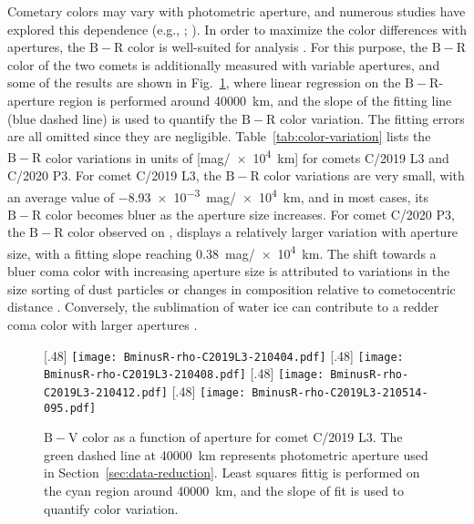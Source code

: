 Cometary colors may vary with photometric aperture, and numerous studies have explored this dependence (e.g., \citealt{betzler_analysis_2017}; \citealt{kolokolova_color_2003}). In order to maximize the color differences with apertures, the $\mathrm{B-R}$ color is well-suited for analysis \citep{jewittCOLORSYSTEMATICSCOMETS2015}. For this purpose, the $\mathrm{B-R}$ color of the two comets is additionally measured with variable apertures, and some of the results are shown in Fig.~\ref{fig:color-aper}, where linear regression on the $\mathrm{B-R}$-aperture region is performed around \qty{40000}{\km}, and the slope of the fitting line (blue dashed line) is used to quantify the $\mathrm{B-R}$ color variation. The fitting errors are all omitted since they are negligible. Table~\ref{tab:color-variation} lists the $\mathrm{B-R}$ color variations in units of [\unit{mag/\qty{e4}{\km}}] for comets C/2019 L3 and C/2020 P3. For comet C/2019 L3, the $\mathrm{B-R}$ color variations are very small, with an average value of \qty{-8.93e-3}{mag/\qty{e4}{\km}}, and in most cases, its $\mathrm{B-R}$ color becomes bluer as the aperture size increases. For comet C/2020 P3, the $\mathrm{B-R}$ color observed on , displays a relatively larger variation with aperture size, with a fitting slope reaching \qty{0.38}{mag/\qty{e4}{\km}}. The shift towards a bluer coma color with increasing aperture size is attributed to variations in the size sorting of dust particles or changes in composition relative to cometocentric distance \citep{kolokolova_physical_2004}. Conversely, the sublimation of water ice can contribute to a redder coma color with larger apertures \citep{kolokolova_color_2003}. 


\begin{figure}
    \centering
    [.48\linewidth]{
        \texttt{[image: BminusR-rho-C2019L3-210404.pdf]}
    }
    [.48\linewidth]{
        \texttt{[image: BminusR-rho-C2019L3-210408.pdf]}
    }
    [.48\linewidth]{
        \texttt{[image: BminusR-rho-C2019L3-210412.pdf]}
    }
    [.48\linewidth]{
        \texttt{[image: BminusR-rho-C2019L3-210514-095.pdf]}
    }
    \caption{$\mathrm{B-V}$ color as a function of aperture for comet C/2019 L3. The green dashed line at {\qty{40000}{\km}} represents photometric aperture used in Section~\ref{sec:data-reduction}. Least squares fittig is performed on the cyan region around {\qty{40000}{\km}}, and the slope of fit is used to quantify color variation. }
    \label{fig:color-aper}
\end{figure}


